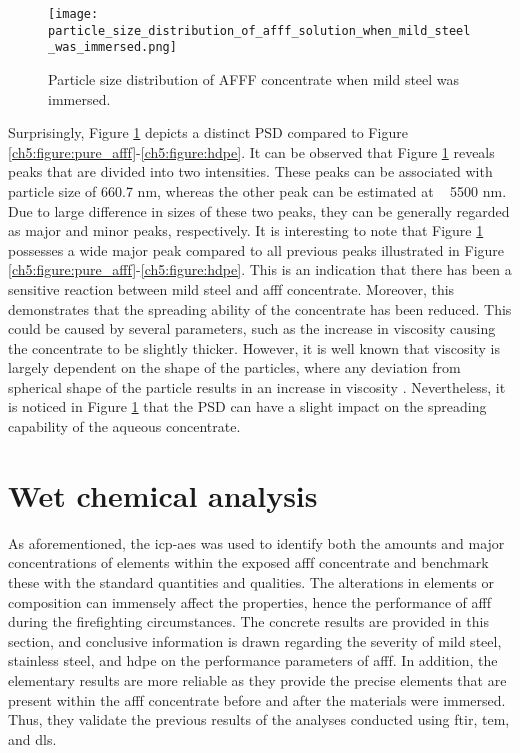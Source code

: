 \begin{figure}[H]
    \centering
    \texttt{[image: particle\_size\_distribution\_of\_afff\_solution\_when\_mild\_steel\_was\_immersed.png]}
    \caption{Particle size distribution of AFFF concentrate when mild steel was immersed.}
    \label{ch5:figure:mild_steel}
\end{figure}

Surprisingly, Figure \ref{ch5:figure:mild_steel} depicts a distinct PSD compared to Figure \ref{ch5:figure:pure_afff}-\ref{ch5:figure:hdpe}. It can be observed that Figure \ref{ch5:figure:mild_steel} reveals peaks that are divided into two intensities. These peaks can be associated with particle size of 660.7 nm, whereas the other peak can be estimated at ~ 5500 nm.  Due to large difference in sizes of these two peaks, they can be generally regarded as major and minor peaks, respectively.  It is interesting to note that Figure \ref{ch5:figure:mild_steel} possesses a wide major peak compared to all previous peaks illustrated in Figure \ref{ch5:figure:pure_afff}-\ref{ch5:figure:hdpe}. This is an indication that there has been a sensitive reaction between mild steel and \acrshort{afff} concentrate. Moreover, this demonstrates that the spreading ability of the concentrate has been reduced. This could be caused by several parameters, such as the increase in viscosity causing the concentrate to be slightly thicker. However, it is well known that viscosity is largely dependent on the shape of the particles, where any deviation from spherical shape of the particle results in an increase in viscosity \cite{klein2011transmission}. Nevertheless, it is noticed in Figure \ref{ch5:figure:mild_steel} that the PSD can have a slight impact on the spreading capability of the aqueous concentrate.

\section{Wet chemical analysis}
As aforementioned, the \acrshort{icp-aes} was used to identify both the amounts and major concentrations of elements within the exposed \acrshort{afff} concentrate and benchmark these with the standard quantities and qualities. The alterations in elements or composition can immensely affect the properties, hence the performance of \acrshort{afff} during the firefighting circumstances. The concrete results are provided in this section, and conclusive information is drawn regarding the severity of mild steel, stainless steel, and \acrshort{hdpe} on the performance parameters of \acrshort{afff}. In addition, the elementary results are more reliable as they provide the precise elements that are present within the \acrshort{afff} concentrate before and after the materials were immersed. Thus, they validate the previous results of the analyses conducted using \acrshort{ftir}, \acrshort{tem}, and \acrshort{dls}.

